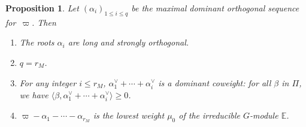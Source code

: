 \documentclass[10pt]{amsart}
\let\oldvee\vee
\renewcommand{\vee}{{\scriptscriptstyle\oldvee}}
\theoremstyle{plain}
\newtheorem{prop}[theo]{Proposition}
\theoremstyle{definition}
\let\la\langle
\let\ra\rangle
\newcommand{\bE}{\mathbb{E}}
\newcommand{\rkm}{{r_M}}
\begin{document}
\begin{prop}
\label{prop:cascade}
Let $(\alpha_i)_{1 \leq i \leq q}$ be the maximal dominant orthogonal sequence for~$\varpi$. Then
\begin{enumerate}
\item\label{prop:cascade1}
The roots $\alpha_i$ are long and strongly orthogonal.
\item\label{prop:cascade2}
$q=\rkm$.
\item\label{prop:cascade3}
For any integer $i \leq \rkm$, $\alpha_1^\vee + \cdots + \alpha_i^\vee$ is a dominant coweight:
for all $\beta$ in $\Pi$, we have $\la \beta, \alpha_1^\vee + \cdots + \alpha_i^\vee\ra\geq 0$.
\item\label{prop:cascade4}
$\varpi - \alpha_1 - \cdots - \alpha_\rkm$ is the lowest weight $\mu_0$ of the irreducible
$G$-module $\bE$.
\end{enumerate}
\end{prop}
\end{document}
